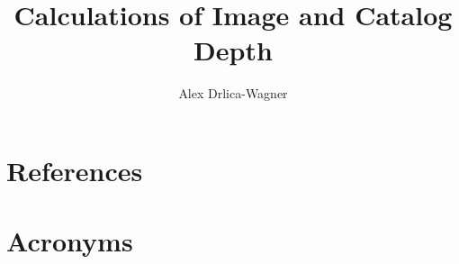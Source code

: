 \documentclass[DM,authoryear,toc]{lsstdoc}
\title{Calculations of Image and Catalog Depth}
\author{%
Alex Drlica-Wagner
}
\date{\vcsDate}
\begin{document}
\maketitle


\appendix
\section{References} \label{sec:bib}
\renewcommand{\refname}{} %


\section{Acronyms} \label{sec:acronyms}

\end{document}
